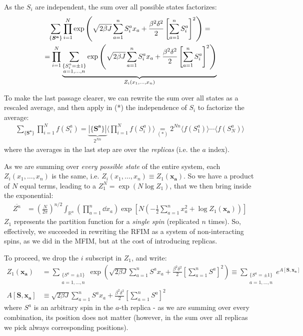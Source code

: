 \documentclass[../template.tex]{subfiles}
\begin{document}
As the $S_i$ are independent, the sum over all possible states factorizes:
\begin{align*}
    \sum_{\{\bm{S^a}\}}  \prod_{i=1}^N    \exp\left( \sqrt{2 \beta J} \sum_{a=1}^n S_i^a x_a  + \frac{\beta^2 \delta^2}{2} \left[\sum_{a=1}^n S_i^a\right]^2\right) = \span \\
    &= \prod_{i=1}^N \underbrace{\sum_{\substack{\{S^a_i = \pm 1\}\\a=1,\dots,n}} \exp\left( \sqrt{2 \beta J} \sum_{a=1}^n S_i^a x_a  + \frac{\beta^2 \delta^2}{2} \left[\sum_{a=1}^n S_i^a\right]^2\right)}_{Z_i(x_1, \dots, x_n)} 
\end{align*}

\begin{expl} To make the last passage clearer, we can rewrite the sum over all states as a rescaled average, and then apply in (*) the independence of $S_i$ to factorize the average:
    \begin{align*}
        \sum_{\{\bm{S^a}\}} \prod_{i=1}^N f(S_i^a) = \underbrace{|\{\bm{S^a}\} |}_{2^{Nn}} \langle \prod_{i=1}^N f(S_i^a) \rangle \underset{(*)}{=}  2^{Nn} \langle f(S_1^a) \rangle \cdots \langle f(S_N^a) \rangle
    \end{align*} 
    where the averages in the last step are over the \textit{replicas} (i.e. the $a$ index).    
\end{expl}


As we are summing over \textit{every possible state} of the entire system, each $Z_i(x_1, \dots, x_n)$ is the same, i.e. $Z_i(x_1, \dots, x_n) \equiv Z_1(\bm{x_a})$. So we have a product of $N$ equal terms, leading to a $Z_1^N = \exp(N \log Z_1)$, that we then bring inside the exponential:
\begin{align} \label{eqn:st3}
    \overline{Z^n} &=  \left(\frac{N}{2 \pi} \right)^{n/2} \int_{\mathbb{R}^n} \left(\prod_{a=1}^n \dd{x_a}\right) \exp\left[N\left(-\frac{1}{2} \sum_{a=1}^n x_a^2 + \log Z_1(\bm{x_a}) \right)\right]
\end{align}
$Z_1$ represents the partition function for a \textit{single spin} (replicated $n$ times). So, effectively, we succeeded in rewriting the RFIM as a system of non-interacting spins, as we did in the MFIM, but at the cost of introducing replicas.

\medskip

To proceed, we drop the $i$ subscript in $Z_1$, and write:
\begin{align} \nonumber
    Z_1(\bm{x_a}) &= \sum_{\substack{\{S^a = \pm 1\}\\a=1,\dots,n}} \exp\left( \sqrt{2 \beta J} \sum_{a=1}^n S^a x_a  + \frac{\beta^2 \delta^2}{2} \left[\sum_{a=1}^n S^a\right]^2\right) \equiv  \sum_{\substack{\{S^a = \pm 1\}\\a=1,\dots,n}} e^{A[\bm{S}, \bm{x_a}]}\\
    A[\bm{S}, \bm{x_a}] &\equiv \sqrt{2 \beta J} \sum_{a=1}^n S^a x_a + \frac{\beta^2 \delta^2}{2} \left[\sum_{a=1}^n S^a\right]^2 \label{eqn:Aterm}
\end{align}
where $S^a$ is an arbitrary spin in the $a$-th replica - as we are summing over every combination, its position does not matter (however, in the sum over all replicas we pick always corresponding positions). 
\end{document}
